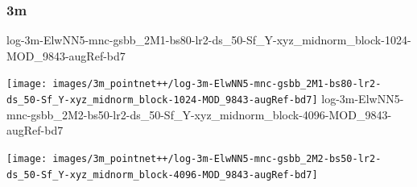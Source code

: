 \documentclass{article}
\begin{document}
\subsubsection{3m}
log-3m-ElwNN5-mnc-gsbb\_2M1-bs80-lr2-ds\_50-Sf\_Y-xyz\_midnorm\_block-1024-MOD\_9843-augRef-bd7 \par
\texttt{[image: images/3m\_pointnet++/log-3m-ElwNN5-mnc-gsbb\_2M1-bs80-lr2-ds\_50-Sf\_Y-xyz\_midnorm\_block-1024-MOD\_9843-augRef-bd7]}
log-3m-ElwNN5-mnc-gsbb\_2M2-bs50-lr2-ds\_50-Sf\_Y-xyz\_midnorm\_block-4096-MOD\_9843-augRef-bd7 \par 
\texttt{[image: images/3m\_pointnet++/log-3m-ElwNN5-mnc-gsbb\_2M2-bs50-lr2-ds\_50-Sf\_Y-xyz\_midnorm\_block-4096-MOD\_9843-augRef-bd7]}	
\end{document}
